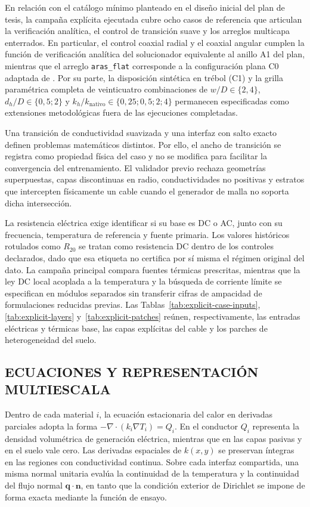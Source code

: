 En relación con el catálogo mínimo planteado en el diseño inicial del plan de tesis, la campaña explícita ejecutada cubre ocho casos de referencia que articulan la verificación analítica, el control de transición suave y los arreglos multicapa enterrados. En particular, el control coaxial radial y el coaxial angular cumplen la función de verificación analítica del solucionador equivalente al anillo A1 del plan, mientras que el arreglo \texttt{aras\_flat} corresponde a la configuración plana C0 adaptada de \textcite{aras2005}. Por su parte, la disposición sintética en trébol (C1) y la grilla paramétrica completa de veinticuatro combinaciones de $w/D\in\{2,4\}$, $d_h/D\in\{0{,}5;2\}$ y $k_h/k_{\mathrm{nativo}}\in\{0{,}25;0{,}5;2;4\}$ permanecen especificadas como extensiones metodológicas fuera de las ejecuciones completadas.

Una transición de conductividad suavizada y una interfaz con salto exacto definen problemas matemáticos distintos. Por ello, el ancho de transición se registra como propiedad física del caso y no se modifica para facilitar la convergencia del entrenamiento. El validador previo rechaza geometrías superpuestas, capas discontinuas en radio, conductividades no positivas y estratos que intercepten físicamente un cable cuando el generador de malla no soporta dicha intersección.

La resistencia eléctrica exige identificar si su base es DC o AC, junto con su frecuencia, temperatura de referencia y fuente primaria. Los valores históricos rotulados como $R_{20}$ se tratan como resistencia DC dentro de los controles declarados, dado que esa etiqueta no certifica por sí misma el régimen original del dato. La campaña principal compara fuentes térmicas prescritas, mientras que la ley DC local acoplada a la temperatura y la búsqueda de corriente límite se especifican en módulos separados sin transferir cifras de ampacidad de formulaciones reducidas previas. Las Tablas~\ref{tab:explicit-case-inputs}, \ref{tab:explicit-layers} y~\ref{tab:explicit-patches} reúnen, respectivamente, las entradas eléctricas y térmicas base, las capas explícitas del cable y los parches de heterogeneidad del suelo.



\subsection{ECUACIONES Y REPRESENTACIÓN MULTIESCALA}

Dentro de cada material $i$, la ecuación estacionaria del calor en derivadas parciales adopta la forma $-\nabla\cdot(k_i\nabla T_i)=Q_i$. En el conductor $Q_i$ representa la densidad volumétrica de generación eléctrica, mientras que en las capas pasivas y en el suelo vale cero. Las derivadas espaciales de $k(x,y)$ se preservan íntegras en las regiones con conductividad continua. Sobre cada interfaz compartida, una misma normal unitaria evalúa la continuidad de la temperatura y la continuidad del flujo normal $\mathbf{q}\cdot\mathbf{n}$, en tanto que la condición exterior de Dirichlet se impone de forma exacta mediante la función de ensayo.

